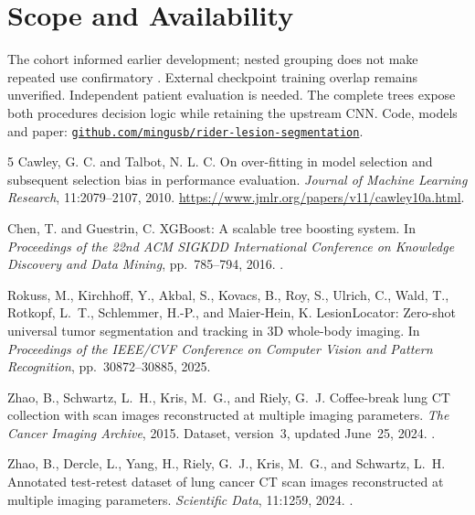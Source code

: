 \section{Scope and Availability}
The cohort informed earlier development; nested grouping does not make repeated use confirmatory \citep{cawley2010}. External checkpoint training overlap remains unverified. Independent patient evaluation is needed. The complete trees expose both procedures\textquotesingle{} decision logic while retaining the upstream CNN. Code, models and paper: \href{https://github.com/mingusb/rider-lesion-segmentation}{\texttt{github.com/mingusb/rider-lesion-segmentation}}.

\clearpage
\begin{thebibliography}{5}
Cawley, G. C. and Talbot, N. L. C.
On over-fitting in model selection and subsequent selection bias in performance evaluation.
\emph{Journal of Machine Learning Research}, 11:2079--2107, 2010.
\url{https://www.jmlr.org/papers/v11/cawley10a.html}.

Chen, T. and Guestrin, C.
XGBoost: A scalable tree boosting system.
In \emph{Proceedings of the 22nd ACM SIGKDD International Conference on Knowledge Discovery and Data Mining}, pp.~785--794, 2016.
.

Rokuss, M., Kirchhoff, Y., Akbal, S., Kovacs, B., Roy, S., Ulrich, C., Wald, T., Rotkopf, L.~T., Schlemmer, H.-P., and Maier-Hein, K.
LesionLocator: Zero-shot universal tumor segmentation and tracking in 3D whole-body imaging.
In \emph{Proceedings of the IEEE/CVF Conference on Computer Vision and Pattern Recognition}, pp.~30872--30885, 2025.

Zhao, B., Schwartz, L.~H., Kris, M.~G., and Riely, G.~J.
Coffee-break lung CT collection with scan images reconstructed at multiple imaging parameters.
\emph{The Cancer Imaging Archive}, 2015. Dataset, version~3, updated June~25, 2024.
.

Zhao, B., Dercle, L., Yang, H., Riely, G.~J., Kris, M.~G., and Schwartz, L.~H.
Annotated test-retest dataset of lung cancer CT scan images reconstructed at multiple imaging parameters.
\emph{Scientific Data}, 11:1259, 2024.
.
\end{thebibliography}

